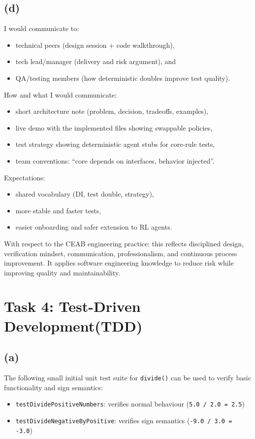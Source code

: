 \subsection{(d)}
I would communicate to:
\begin{itemize}
    \item technical peers (design session + code walkthrough),
    \item tech lead/manager (delivery and risk argument), and
    \item QA/testing members (how deterministic doubles improve test quality).
\end{itemize}

How and what I would communicate:
\begin{itemize}
    \item short architecture note (problem, decision, tradeoffs, examples),
    \item live demo with the implemented files showing swappable policies,
    \item test strategy showing deterministic agent stubs for core-rule tests,
    \item team conventions: ``core depends on interfaces, behavior injected''.
\end{itemize}

Expectations:
\begin{itemize}
    \item shared vocabulary (DI, test double, strategy),
    \item more stable and faster tests,
    \item easier onboarding and safer extension to RL agents.
\end{itemize}

With respect to the CEAB engineering practice: this reflects disciplined design, verification mindset, communication, professionalism, and continuous process improvement. It applies software engineering knowledge to reduce risk while improving quality and maintainability.

\section{Task 4: Test-Driven Development(TDD)}
\subsection{(a)}
The following small initial unit test suite for \texttt{divide()} can be used to verify basic functionality and sign semantics:
\begin{itemize}
    \item \texttt{testDividePositiveNumbers}: verifies normal behaviour (\texttt{5.0 / 2.0 = 2.5})
    \item \texttt{testDivideNegativeByPositive}: verifies sign semantics (\texttt{-9.0 / 3.0 = -3.0})
\end{itemize}

